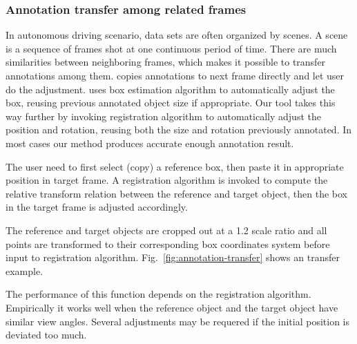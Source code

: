 \documentclass[letterpaper, 10 pt, conference]{ieeeconf}  %
\begin{document}
\subsubsection{Annotation transfer among related frames}
\label{semi-auto-anno}
In autonomous driving scenario, data sets are often organized by scenes\cite{Caesar2019nuScenesAM,Patil2019TheHD,lyft2019}. A scene is a sequence of frames shot at one continuous period of time. There are much similarities between neighboring frames, which makes it possible to transfer annotations among them. \cite{Zimmer20193DBA} copies annotations to next frame directly and let user do the adjustment.\cite{Wang2019LATTEAL} uses box estimation algorithm to automatically adjust the box, reusing previous annotated object size if appropriate. Our tool takes this way further by invoking registration algorithm \cite{Yang2016GoICPAG} to automatically adjust the position and rotation, reusing both the size and rotation previously annotated. In most cases our method produces  accurate enough annotation result.

The user need to first select (copy) a reference box, then paste it in appropriate position in target frame. A registration algorithm is invoked to compute the relative transform relation between the reference and target object, then the box in the target frame is adjusted accordingly.

The reference and target objects are cropped out at a 1.2 scale ratio and all points are transformed to their corresponding box coordinates system before input to registration algorithm. Fig.~\ref{fig:annotation-transfer} shows an transfer example.

The performance of this function depends on the registration algorithm.  Empirically it works well when the reference object and the target object have similar view angles. Several adjustments may be requered if the initial position is deviated too much.
\end{document}
